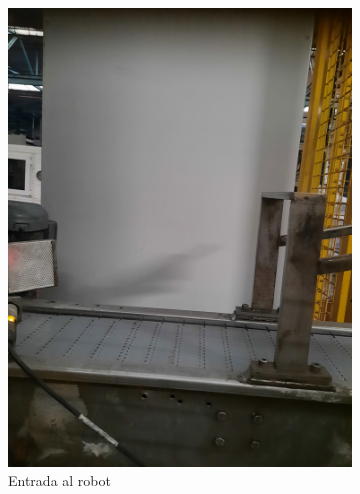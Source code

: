 \documentclass[11pt]{memoir}
\begin{document}
\begin{figure}[H]
\begin{subfigure}{0.3\textwidth}
  \includegraphics[width = \textwidth, angle=270]{img/closeup2}
  \caption{Entrada al robot}
  \label{fig:fin}
\end{subfigure}\hfill
\begin{subfigure}{0.3\textwidth}
\centering

\end{subfigure}
\end{figure}
\end{document}
